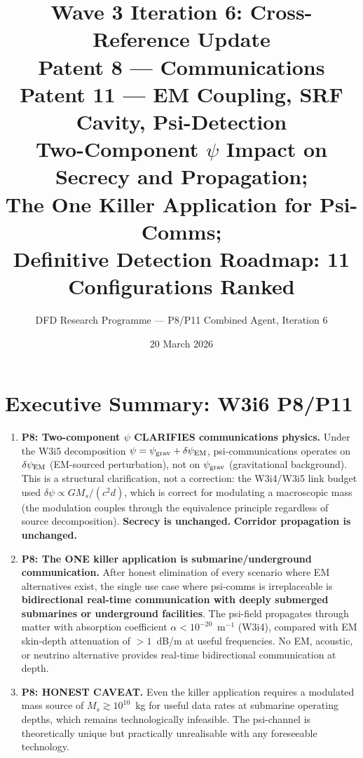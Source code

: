 \documentclass[11pt]{article}
\title{\textbf{Wave 3 Iteration 6: Cross-Reference Update}\\[6pt]
Patent 8 --- Communications\\
Patent 11 --- EM Coupling, SRF Cavity, Psi-Detection\\[4pt]
{\normalsize Two-Component $\psi$ Impact on Secrecy and Propagation;}\\
{\normalsize The One Killer Application for Psi-Comms;}\\
{\normalsize Definitive Detection Roadmap: 11 Configurations Ranked}}
\author{DFD Research Programme --- P8/P11 Combined Agent, Iteration 6}
\date{20 March 2026}
\theoremstyle{definition}
\theoremstyle{remark}
\newcommand{\psigrav}{\psi_{\rm grav}}
\newcommand{\dpsiEM}{\delta\psi_{\rm EM}}
\begin{document}
\maketitle
\tableofcontents
\newpage

\section*{Executive Summary: W3i6 P8/P11}

\begin{tcolorbox}[colback=blue!5!white, colframe=blue!60!black,
  title=CRITICAL W3i6 RESULTS --- READ FIRST]
\begin{enumerate}[nosep]

\item \textbf{P8: Two-component $\psi$ CLARIFIES communications physics.}
  Under the W3i5 decomposition $\psi = \psigrav + \dpsiEM$, psi-communications
  operates on $\dpsiEM$ (EM-sourced perturbation), not on $\psigrav$
  (gravitational background). This is a structural clarification, not a
  correction: the W3i4/W3i5 link budget used $\delta\psi \propto GM_s/(c^2 d)$,
  which is correct for modulating a macroscopic mass (the modulation
  couples through the equivalence principle regardless of source decomposition).
  \textbf{Secrecy is unchanged.} \textbf{Corridor propagation is unchanged.}

\item \textbf{P8: The ONE killer application is submarine/underground
  communication.} After honest elimination of every scenario where EM
  alternatives exist, the single use case where psi-comms is irreplaceable
  is \textbf{bidirectional real-time communication with deeply submerged
  submarines or underground facilities}. The psi-field propagates through
  matter with absorption coefficient $\alpha < 10^{-20}$~m$^{-1}$ (W3i4),
  compared with EM skin-depth attenuation of $>1$~dB/m at useful
  frequencies. No EM, acoustic, or neutrino alternative provides
  real-time bidirectional communication at depth.

\item \textbf{P8: HONEST CAVEAT.} Even the killer application requires a
  modulated mass source of $M_s \gtrsim 10^{10}$~kg for useful data rates
  at submarine operating depths, which remains technologically infeasible.
  The psi-channel is theoretically unique but practically unrealisable
  with any foreseeable technology.


\end{enumerate}
\end{tcolorbox}
\end{document}
